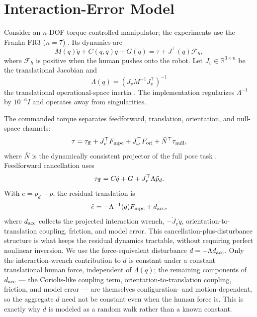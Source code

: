 \documentclass[conference]{IEEEtran}
\newcommand{\Fmpc}{F_{\mathrm{mpc}}}
\newcommand{\Nbar}{\bar N}
\begin{document}
\section{Interaction-Error Model}

Consider an $n$-DOF torque-controlled manipulator; the experiments use the
Franka FR3 ($n=7$) \cite{franka2023fr3}. Its dynamics are
\begin{equation}
M(q)\ddot q+C(q,\dot q)\dot q+G(q)=\tau+J^\top(q)\mathcal F_h,
\label{eq:eom}
\end{equation}
where $\mathcal F_h$ is positive when the human pushes onto the robot. Let
$J_v\in\mathbb R^{3\times n}$ be the translational Jacobian and
\begin{equation}
\Lambda(q)=\left(J_vM^{-1}J_v^\top\right)^{-1}
\label{eq:lambda}
\end{equation}
the translational operational-space inertia \cite{khatib1987unified}. The
implementation regularizes $\Lambda^{-1}$ by $10^{-6}I$ and operates away
from singularities.

The commanded torque separates feedforward, translation, orientation, and
null-space channels:
\begin{equation}
\tau=\tau_{\rm ff}+J_v^\top\Fmpc+J_\omega^\top F_{\rm ori}
      +\Nbar^\top\tau_{\rm null},
\label{eq:torque}
\end{equation}
where $\Nbar$ is the dynamically consistent projector of the full pose task
\cite{sentis2005synthesis}. Feedforward cancellation uses
\begin{equation}
\tau_{\rm ff}=C\dot q+G+J_v^\top\Lambda\ddot p_d.
\label{eq:feedforward}
\end{equation}
With $e=p_d-p$, the residual translation is
\begin{equation}
\ddot e=-\Lambda^{-1}(q)\Fmpc+d_{\rm acc},
\label{eq:error}
\end{equation}
where $d_{\rm acc}$ collects the projected interaction wrench,
$-\dot J_v\dot q$, orientation-to-translation coupling, friction, and model
error. This cancellation-plus-disturbance structure is what keeps the
residual dynamics tractable, without requiring perfect nonlinear
inversion. We use the force-equivalent disturbance
$d=-\Lambda d_{\rm acc}$. Only the interaction-wrench contribution to $d$ is
constant under a constant translational human force, independent of
$\Lambda(q)$; the remaining components of $d_{\rm acc}$ --- the Coriolis-like
coupling term, orientation-to-translation coupling, friction, and model
error --- are themselves configuration- and motion-dependent, so the
aggregate $d$ need not be constant even when the human force is. This is
exactly why $d$ is modeled as a random walk rather than a known constant.
\end{document}

